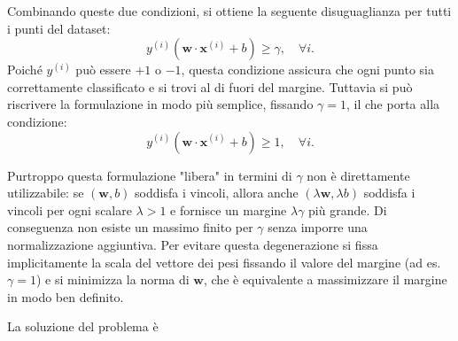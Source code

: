Combinando queste due condizioni, si ottiene la seguente disuguaglianza per tutti i punti del dataset:
\[
y^{(i)}(\mathbf{w} \cdot \mathbf{x}^{(i)} + b) \geq \gamma, \quad \forall i.
\]
Poiché $y^{(i)}$ può essere $+1$ o $-1$, questa condizione assicura che ogni punto sia correttamente classificato e si trovi al di fuori del margine. Tuttavia si può riscrivere la formulazione in modo più semplice, fissando \(\gamma = 1\), il che porta alla condizione:
\[
y^{(i)}(\mathbf{w} \cdot \mathbf{x}^{(i)} + b) \geq 1, \quad \forall i.
\]

Purtroppo questa formulazione "libera" in termini di $\gamma$ non è direttamente utilizzabile: se $(\mathbf{w},b)$ soddisfa i vincoli, allora anche $(\lambda\mathbf{w},\lambda b)$ soddisfa i vincoli per ogni scalare $\lambda>1$ e fornisce un margine $\lambda\gamma$ più grande. Di conseguenza non esiste un massimo finito per $\gamma$ senza imporre una normalizzazione aggiuntiva. Per evitare questa degenerazione si fissa implicitamente la scala del vettore dei pesi fissando il valore del margine (ad es. $\gamma=1$) e si minimizza la norma di $\mathbf{w}$, che è equivalente a massimizzare il margine in modo ben definito.

La soluzione del problema è 